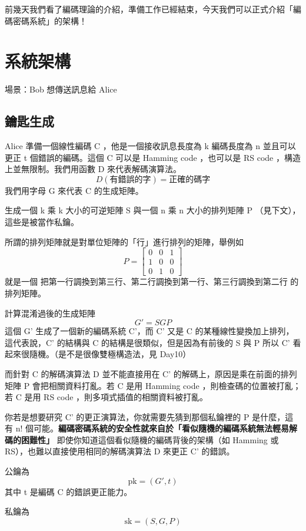 \documentclass[
]{article}
\author{}
\date{}
\begin{document}
前幾天我們看了編碼理論的介紹，準備工作已經結束，今天我們可以正式介紹「編碼密碼系統」的架構！

\hypertarget{ux7cfbux7d71ux67b6ux69cb}{%
\section{系統架構}\label{ux7cfbux7d71ux67b6ux69cb}}

場景：Bob 想傳送訊息給 Alice

\hypertarget{ux9470ux5319ux751fux6210}{%
\subsection{鑰匙生成}\label{ux9470ux5319ux751fux6210}}

Alice 準備一個線性編碼 C ，他是一個接收訊息長度為 k 編碼長度為 n
並且可以更正 t 個錯誤的編碼。這個 C 可以是 Hamming code ，也可以是 RS
code ，構造上並無限制。我們用函數 D 來代表解碼演算法。 \[
D(有錯誤的字) = 正確的碼字 
\] 我們用字母 G 來代表 C 的生成矩陣。

生成一個 k 乘 k 大小的可逆矩陣 S 與一個 n 乘 n 大小的排列矩陣 P
（見下文），這些是被當作私鑰。

所謂的排列矩陣就是對單位矩陣的「行」進行排列的矩陣，舉例如 \[
P = \begin{bmatrix}
0 & 0 & 1 \\
1 & 0 & 0 \\
0 & 1 & 0
\end{bmatrix}
\] 就是一個 把第一行調換到第三行、第二行調換到第一行、第三行調換到第二行
的排列矩陣。

計算混淆過後的生成矩陣 \[
G' = SGP
\] 這個 G' 生成了一個新的編碼系統 C'，而 C' 又是 C
的某種線性變換加上排列，這代表說，C' 的結構與 C
的結構是很類似，但是因為有前後的 S 與 P 所以 C'
看起來很隨機。（是不是很像雙極構造法，見 Day10）

而針對 C 的解碼演算法 D 並不能直接用在 C'
的解碼上，原因是乘在前面的排列矩陣 P 會把相關資料打亂。若 C 是用 Hamming
code ，則檢查碼的位置被打亂；若 C 是用 RS code
，則多項式插值的相關資料被打亂。

你若是想要研究 C' 的更正演算法，你就需要先猜到那個私鑰裡的 P
是什麼，這有 n!
個可能。\textbf{編碼密碼系統的安全性就來自於「看似隨機的編碼系統無法輕易解碼的困難性」}
即使你知道這個看似隨機的編碼背後的架構（如 Hamming 或
RS），也難以直接使用相同的解碼演算法 D 來更正 C' 的錯誤。

公鑰為 \[
\mathrm{pk}=(G', t)
\] 其中 t 是編碼 C 的錯誤更正能力。

私鑰為 \[
\mathrm{sk}= (S,G,P)
\]
\end{document}

